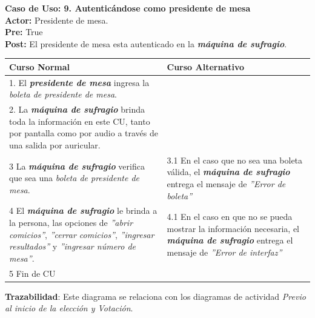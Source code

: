 \documentclass[spanish, 10pt,a4paper]{article}
\numberwithin{equation}{section} %
\begin{document}
\clearpage
\noindent\textbf{Caso de Uso: 9. Autenticándose como presidente de mesa}\\
\textbf{Actor: } Presidente de mesa.\\
\textbf{Pre: } True\\
\textbf{Post: } El presidente de mesa esta autenticado en la \textbf{\textit{máquina de sufragio}}.\\
\begin{table}[H]
  \centering
\bgroup
\def\arraystretch{1.3}
  \begin{tabular}{p{9cm} | p{7cm}}
    \hline
    Curso Normal & Curso Alternativo \\
    \hline
    \hline    
    1. El \textbf{\textit{presidente de mesa}} ingresa la \textit{boleta de presidente de mesa}. 
    & \\
    
    \hline
    2. La \textbf{\textit{máquina de sufragio}} brinda toda la información en este CU, tanto por pantalla como por audio a través de una salida por auricular.
    &
    \\
    
    \hline
    3 La \textbf{\textit{máquina de sufragio}} verifica que sea una \textit{boleta de presidente de mesa}.
    & 
    3.1 En el caso que no sea una boleta válida, el \textbf{\textit{máquina de sufragio}} entrega el mensaje de \textit{''Error de boleta''}
    \\
    
    \hline
    4 El \textbf{\textit{máquina de sufragio}} le brinda a la persona, las opciones de \textit{''abrir comicios''}, \textit{''cerrar comicios''}, \textit{''ingresar resultados''} y \textit{''ingresar número de mesa''}.
    & 
    4.1 En el caso en que no se pueda mostrar la información necesaria, el \textbf{\textit{máquina de sufragio}} entrega el mensaje de \textit{''Error de interfaz''}
    \\
    

    \hline
    5 Fin de CU
    & \\
    \hline
  \end{tabular}
\egroup
\end{table}
\vspace{-10px}
\noindent\textbf{Trazabilidad}: Este diagrama se relaciona con los diagramas de actividad \textit{Previo al inicio de la elección y Votación}.\\
\end{document}
